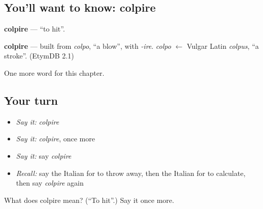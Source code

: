 \subsection*{You'll want to know: colpire}
\textbf{colpire} — \textquotedblleft{}to hit\textquotedblright{}.

\begin{cousinweb}
\textbf{colpire} — built from \emph{colpo}, \textquotedblleft{}a blow\textquotedblright{}, with \emph{-ire}. \emph{colpo} $\leftarrow$ Vulgar Latin \emph{colpus}, \textquotedblleft{}a stroke\textquotedblright{}. (EtymDB 2.1)
\end{cousinweb}

\begin{grammarlens}[title={What you've built}]
One more word for this chapter.
\end{grammarlens}

\subsection*{Your turn}
\begin{itemize}
\raggedright
  \item \emph{Say it:} \emph{colpire}
  \item \emph{Say it:} \emph{colpire}, once more
  \item \emph{Say it:} say \emph{colpire}
  \item \emph{Recall:} say the Italian for to throw away, then the Italian for to calculate, then say \emph{colpire} again
\end{itemize}

\begin{tcolorbox}[breakable,colback=teal!4,colframe=teal!35!black,title={Before you move on}]
What does colpire mean? (\textquotedblleft{}To hit\textquotedblright{}.) Say it once more.
\end{tcolorbox}
